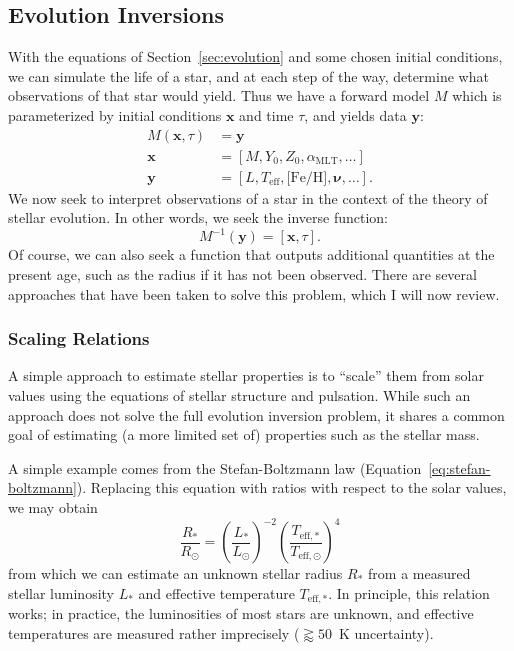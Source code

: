 \subsection{Evolution Inversions} 

With the equations of Section~\ref{sec:evolution} and some chosen initial conditions, we can simulate the life of a star, and at each step of the way, determine what observations of that star would yield. 
Thus we have a forward model $M$ which is parameterized by initial conditions $\mathbf{x}$ and time $\tau$, and yields data $\mathbf{y}$:
\begin{align}
    M(\mathbf{x}, \tau)
    &=
    \mathbf{y}
    \\
    \mathbf{x}
    &=
    [M,Y_0,Z_0,\alpha_{\text{MLT}}, \ldots]%
    \\
    \mathbf{y}
    &=
    [L, T_{\text{eff}}, \text{[Fe/H]}, \boldsymbol{\nu}, \ldots].
\end{align}
We now seek to interpret observations of a star in the context of the theory of stellar evolution. 
In other words, we seek the inverse function:
\begin{equation}
    M^{-1}(\mathbf{y})
    =
    [\mathbf{x}, \tau].
\end{equation}
Of course, we can also seek a function that outputs additional quantities at the present age, such as the radius if it has not been observed. 
There are several approaches that have been taken to solve this problem, which I will now review. 

\subsubsection*{Scaling Relations}
\label{sec:scaling}
A simple approach to estimate stellar properties is to ``scale'' them from solar values using the equations of stellar structure and pulsation. 
While such an approach does not solve the full evolution inversion problem, it shares a common goal of estimating (a more limited set of) properties such as the stellar mass. 

A simple example comes from the Stefan-Boltzmann law (Equation~\ref{eq:stefan-boltzmann}). 
Replacing this equation with ratios with respect to the solar values, we may obtain 
\begin{equation}
    \frac{R_\ast}{R_\odot}
    =
    \left(
        \frac{L_\ast}{L_\odot}
    \right)^{-2}
    \left(
        \frac{T_{\text{eff},\ast}}{T_{\text{eff},\odot}}
    \right)^4
\end{equation}
from which we can estimate an unknown stellar radius $R_\ast$ from a measured stellar luminosity $L_\ast$ and effective temperature $T_{\text{eff},\ast}$. 
In principle, this relation works; in practice, the luminosities of most stars are unknown, and effective temperatures are measured rather imprecisely (${\gtrapprox 50}$~K uncertainty). 

